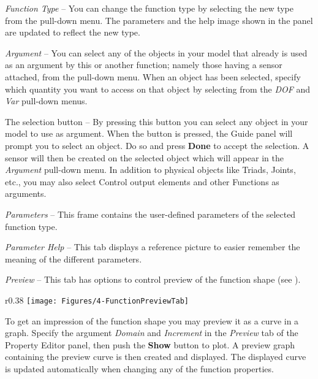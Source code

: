 \begin{bulletlist}
\item{\sl Function Type} -- You can
  change the function type by selecting the new type from the pull-down menu.
  The parameters and the help image shown in the panel are updated to reflect
  the new type.

\item{\sl Argument} --
  You can select any of the objects in your model that
  already is used as an argument by this or another function; namely
  those having a sensor attached, from the pull-down menu. When an object
  has been selected, specify which
  quantity you want to access on that object by selecting from the
  {\sl DOF} and {\sl Var} pull-down menus.

\item The selection button -- By pressing this button
  you can select any object in your model to use as argument.
  When the button is pressed, the Guide panel will prompt you to select an
  object. Do so and press \textbf{Done} to accept the selection.
  A sensor will then be created on the selected object which will appear in the
  {\sl Argument} pull-down menu. In addition to physical objects like Triads,
  Joints, etc., you may also select Control output elements and other Functions
  as arguments.

\item{\sl Parameters} --
  This frame contains the user-defined parameters of the selected function type.

\item{\sl Parameter Help} --
  This tab displays a reference picture to easier remember the meaning of
  the different parameters.

\item{\sl Preview} --
  This tab has options to control preview of the function shape
  (see ).
\end{bulletlist}



\begin{wrapfigure}[9]{r}{0.38\textwidth}
  \vspace{-4mm}
  \texttt{[image: Figures/4-FunctionPreviewTab]}
\end{wrapfigure}

To get an impression of the function shape you may preview it as a curve in
a graph. Specify the argument {\sl Domain} and {\sl Increment} in the
{\sl Preview} tab of the Property Editor panel, then push the
\textbf{Show} button to plot. A preview graph containing the preview
curve is then created and displayed. The displayed curve is updated
automatically when changing any of the function properties.


